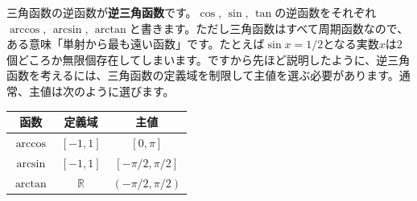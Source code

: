 三角函数の逆函数が\textbf{逆三角函数}です。$\cos$, $\sin$, $\tan$の逆函数をそれぞれ$\arccos$, $\arcsin$, $\arctan$と書きます。ただし三角函数はすべて周期函数なので、ある意味「単射から最も遠い函数」です。たとえば$\sin x = 1/2$となる実数$x$は$2$個どころか無限個存在してしまいます。ですから先ほど説明したように、逆三角函数を考えるには、三角函数の定義域を制限して主値を選ぶ必要があります。通常、主値は次のように選びます。

\begin{table}[h!tbp]
\begin{center}
\begin{tabular}{ccc} \hline
函数 & 定義域 & 主値 \\ \hline
$\arccos$ & $[-1,1]$ & $[0,\pi]$ \\
$\arcsin$ & $[-1,1]$ & $[-\pi/2,\pi/2]$ \\
$\arctan$ & $\mathbb{R}$ & $(-\pi/2,\pi/2)$ \\ \hline
\end{tabular}
\end{center}
\end{table}

